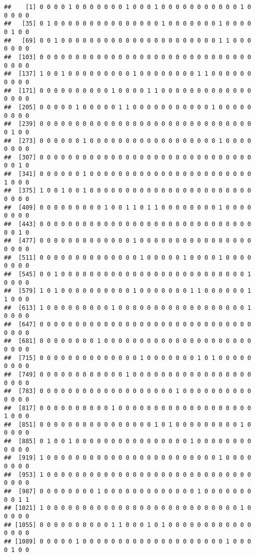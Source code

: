 \documentclass[]{article}
\begin{document}
\begin{verbatim}
##    [1] 0 0 0 0 1 0 0 0 0 0 0 0 1 0 0 0 1 0 0 0 0 0 0 0 0 0 0 0 1 0 0 0 0 0
##   [35] 0 1 0 0 0 0 0 0 0 0 0 0 0 0 0 0 0 1 0 0 0 0 0 0 0 1 0 0 0 0 0 1 0 0
##   [69] 0 0 1 0 0 0 0 0 0 0 0 0 0 0 0 0 0 0 0 0 0 0 0 0 0 1 1 0 0 0 0 0 0 0
##  [103] 0 0 0 0 0 0 0 0 0 0 0 0 0 0 0 0 0 0 0 0 0 0 0 0 0 0 0 0 0 0 0 0 0 0
##  [137] 1 0 0 1 0 0 0 0 0 0 0 0 0 1 0 0 0 0 0 0 0 0 1 1 0 0 0 0 0 0 0 0 0 0
##  [171] 0 0 0 0 0 0 0 0 0 0 1 0 0 0 0 1 1 0 0 0 0 0 0 0 0 0 0 0 0 0 0 0 0 0
##  [205] 0 0 0 0 0 1 0 0 0 0 0 1 1 0 0 0 0 0 0 0 0 0 0 0 1 0 0 0 0 0 0 0 0 0
##  [239] 0 0 0 0 0 0 0 0 0 0 0 0 0 0 0 0 0 0 0 0 0 0 0 0 0 0 0 0 0 0 0 1 0 0
##  [273] 0 0 0 0 0 0 1 0 0 0 0 0 0 0 0 0 0 0 0 0 0 0 0 0 0 1 0 0 0 0 0 0 0 0
##  [307] 0 0 0 0 0 0 0 0 0 0 0 0 0 0 0 0 0 0 0 0 0 0 0 0 0 0 0 0 0 0 0 0 1 0
##  [341] 0 0 0 0 0 0 1 0 0 0 0 0 0 0 0 0 0 0 0 0 0 0 0 0 0 0 0 0 0 0 1 0 0 0
##  [375] 1 0 0 1 0 0 1 0 0 0 0 0 0 0 0 0 0 0 0 0 0 0 0 0 0 0 0 0 0 0 0 0 0 0
##  [409] 0 0 0 0 0 0 0 0 0 1 0 0 1 1 0 1 1 0 0 0 0 0 0 0 0 1 0 0 0 0 0 0 0 0
##  [443] 0 0 0 0 0 0 0 0 0 0 0 0 0 0 0 0 0 0 0 0 0 0 0 0 0 0 0 0 0 0 0 0 1 0
##  [477] 0 0 0 0 0 0 0 0 0 0 0 0 0 1 0 0 0 0 0 0 0 0 0 0 0 0 0 0 0 0 0 0 0 0
##  [511] 0 0 0 0 0 0 0 0 0 0 0 0 0 0 1 0 0 0 0 0 1 0 0 0 0 1 0 0 0 0 0 0 0 0
##  [545] 0 0 1 0 0 0 0 0 0 0 0 0 0 0 0 0 0 0 0 0 0 0 0 0 0 0 0 0 0 1 0 0 0 0
##  [579] 1 0 1 0 0 0 0 0 0 0 0 0 0 1 0 0 0 0 0 0 0 1 1 0 0 0 0 0 0 1 1 0 0 0
##  [613] 1 0 0 0 0 0 0 0 0 0 1 0 0 0 0 0 0 0 0 0 0 0 0 0 0 0 0 0 0 1 0 0 0 0
##  [647] 0 0 0 0 0 0 0 0 0 0 0 0 0 0 0 0 0 0 0 0 0 0 0 0 0 0 0 0 0 0 0 0 0 0
##  [681] 0 0 0 0 0 0 0 0 1 0 0 0 0 0 0 0 0 0 0 0 0 0 0 0 0 0 0 0 0 0 0 0 0 0
##  [715] 0 0 0 0 0 0 0 0 0 0 0 0 0 0 1 0 0 0 0 0 0 0 1 0 1 0 0 0 0 0 0 0 0 0
##  [749] 0 0 0 0 0 0 0 0 0 0 0 0 1 0 0 0 0 0 0 0 0 0 0 0 0 0 0 0 0 0 0 0 0 0
##  [783] 0 0 0 0 0 0 0 0 0 0 0 0 0 0 0 0 0 0 0 1 0 0 0 0 0 0 0 0 0 0 0 0 0 0
##  [817] 0 0 0 0 0 0 0 0 0 0 1 0 0 0 0 0 0 0 0 0 0 0 0 0 0 0 0 0 0 0 1 0 0 0
##  [851] 0 0 0 0 0 0 0 0 0 0 0 0 0 0 0 0 1 0 1 0 0 0 0 0 0 0 0 0 1 0 0 0 0 0
##  [885] 0 1 0 0 1 0 0 0 0 0 0 0 0 0 0 0 0 0 0 0 0 1 0 0 0 0 0 0 0 0 0 0 0 0
##  [919] 1 0 0 0 0 0 0 0 0 0 0 0 0 0 0 0 0 0 0 0 0 0 0 0 0 1 0 0 0 0 0 0 0 0
##  [953] 1 0 0 0 0 0 0 0 0 0 0 0 0 0 0 0 0 0 0 0 0 0 0 0 0 0 0 0 0 0 0 0 0 0
##  [987] 0 0 0 0 0 0 0 0 1 0 0 0 0 0 0 0 0 0 0 0 0 0 1 0 0 0 0 0 0 0 0 0 1 1
## [1021] 1 0 0 0 0 0 0 0 0 0 0 0 0 0 0 0 0 0 0 0 0 0 0 0 0 0 0 0 1 0 0 0 0 0
## [1055] 0 0 0 0 0 0 0 0 0 0 1 1 0 0 0 1 0 1 0 0 0 0 0 0 0 0 0 0 0 0 0 0 0 0
## [1089] 0 0 0 0 0 1 0 0 0 0 0 0 0 0 0 0 0 0 0 0 0 0 0 0 0 0 1 0 0 0 0 1 0 0

\end{verbatim}
\end{document}
